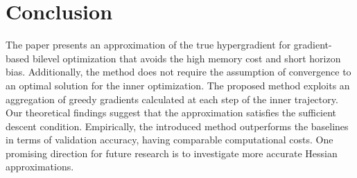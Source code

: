 \section{Conclusion}
The paper presents an approximation of the true hypergradient for gradient-based bilevel optimization that avoids the high memory cost and short horizon bias. Additionally, the method does not require the assumption of convergence to an optimal solution for the inner optimization. The proposed method exploits an aggregation of greedy gradients calculated at each step of the inner trajectory. Our theoretical findings suggest that the approximation satisfies the sufficient descent condition. Empirically, the introduced method outperforms the baselines in terms of validation accuracy, having comparable computational costs. One promising direction for future research is to investigate more accurate Hessian approximations.
